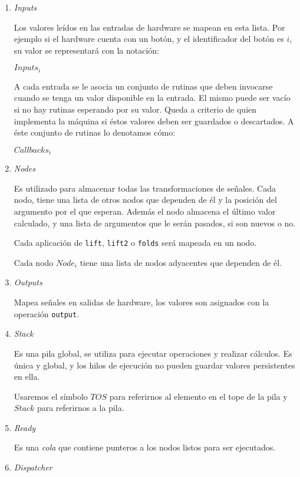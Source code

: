 \begin{enumerate}
\item \emph{Inputs}

  Los valores leídos en las entradas de hardware se mapean
en esta lista. Por ejemplo si el hardware cuenta con un botón,
y el identificador del botón es $i$,
su valor se representará con la notación:

  $Inputs_i$

  A cada entrada se le asocia un conjunto de
rutinas que deben invocarse cuando se tenga un
valor disponible en la entrada. El mismo puede ser vacío si
no hay rutinas esperando por su valor. Queda a criterio de quien
implementa la máquina si éstos valores deben ser guardados o
descartados.
  A éste conjunto de rutinas lo denotamos cómo:

  $Callbacks_i$

\item \emph{Nodes}

  Es utilizado para almacenar todas las transformaciones de señales.
  Cada nodo, tiene una lista de otros nodos que dependen de él y la
  posición del argumento por el que esperan.
  Además el nodo almacena el último valor calculado, y una lista
  de argumentos que le serán pasados, si son nuevos o no.

  Cada aplicación de \texttt{lift}, \texttt{lift2} o \texttt{folds}
será mapeada en un nodo.

  Cada nodo $Node_i$ tiene una lista de nodos adyacentes
que dependen de él.

\item \emph{Outputs}

  Mapea señales en salidas de hardware, los valores
son asignados con la operación \texttt{output}.

\item \emph{Stack}

  Es una pila global, se utiliza para ejecutar operaciones y
realizar cálculos. 
  Es única y global, y los hilos de ejecución no pueden guardar valores
persistentes en ella.

Usaremos el símbolo $TOS$ para referirnos al elemento en el tope
de la pila y $Stack$ para referirnos a la pila.

\item \emph{Ready}

Es una \emph{cola} que contiene punteros a los nodos
listos para ser ejecutados.

\item \emph{Dispatcher}


\end{enumerate}
